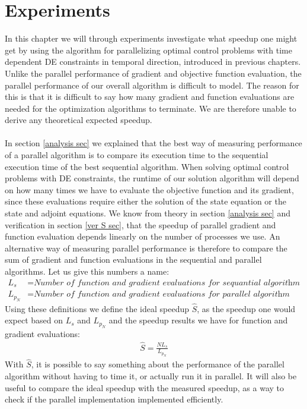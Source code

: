 \chapter{Experiments}\label{Experiments chapter}
In this chapter we will through experiments investigate what speedup one might get by using the algorithm for parallelizing optimal control problems with  time dependent DE constraints in temporal direction, introduced in previous chapters. Unlike the parallel performance of gradient and objective function evaluation, the parallel performance of our overall algorithm is difficult to model. The reason for this is that it is difficult to say how many gradient and function evaluations are needed for the optimization algorithms to terminate. We are therefore unable to derive any theoretical expected speedup.
\\
\\
In section \ref{analysis sec} we explained that the best way of measuring performance of a parallel algorithm is to compare its execution time to the sequential execution time of the best sequential algorithm. When solving optimal control problems with DE constraints, the runtime of our solution algorithm will depend on how many times we have to evaluate the objective function and its gradient, since these evaluations require either the solution of the state equation or the state and adjoint equations. We know from theory in section \ref{analysis sec} and verification in section \ref{ver S sec}, that the speedup of parallel gradient and function evaluation depends linearly on the number of processes we use. An alternative way of measuring parallel performance is therefore to compare the sum of gradient and function evaluations in the sequential and parallel algorithms. Let us give this numbers a name:
\begin{align*}
L_s &= \textit{Number of function and gradient evaluations for sequantial algorithm}\\
L_{p_N} &= \textit{Number of function and gradient evaluations for parallel algorithm using N processes}
\end{align*} 
Using these definitions we define the ideal speedup $\hat{S}$, as the speedup one would expect based on $L_s$ and $L_{p_N}$ and the speedup results we have for function and gradient evaluations:
\begin{align}
\hat S = \frac{NL_s}{L_{p_N}} \label{ideal S}
\end{align}
With $\hat S$, it is possible to say something about the performance of the parallel algorithm without having to time it, or actually run it in parallel. It will also be useful to compare the ideal speedup with the measured speedup, as a way to check if the parallel implementation implemented efficiently.
